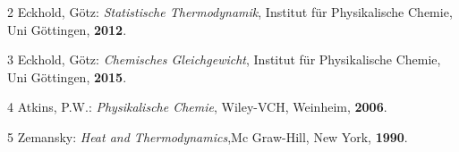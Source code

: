 \documentclass[a4paper,12pt,oneside,onecolum,final,openany]{report}
\begin{document}
\vspace{0,5 cm}

2 \quad Eckhold, Götz: \emph{Statistische Thermodynamik}, Institut für Physikalische Chemie, Uni Göttingen, \textbf{2012}.

\vspace{0,5cm}

3 \quad Eckhold, Götz: \emph{Chemisches Gleichgewicht}, Institut für Physikalische Chemie, Uni Göttingen, \textbf{2015}.\\

\vspace{0,5cm}

4 \quad Atkins, P.W.: \emph{Physikalische Chemie}, Wiley-VCH, Weinheim, \textbf{2006}.\\

\vspace{0,5cm}

5 \quad Zemansky: \emph{Heat and Thermodynamics},Mc Graw-Hill, New York, \textbf{1990}.\\
\end{document}
